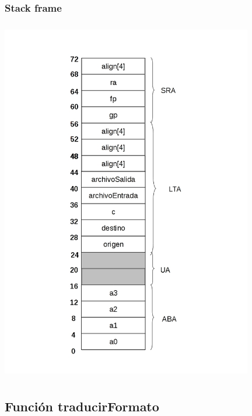 \documentclass[a4paper,10pt]{article}
\begin{document}
    \subsubsection{Stack frame}
      \begin{center}
	\includegraphics[width=11cm, height=16cm]{DibujosStackFrame/stack-parser.jpg}
      \end{center}

  \subsection{Funci\'on traducirFormato}
\end{document}
